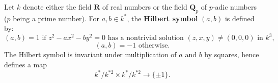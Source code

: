 Let $k$ denote either the field $\mathbf{R}$ of real numbers or the field $\mathbf{Q}_p$ of $p$-adic numbers ($p$ being a prime number). For $a, b \in k^*$, the \textbf{Hilbert symbol} $(a, b)$ is defined by:
$$
(a, b) = 1 \text{ if } z^2 - a x^2 - b y^2 = 0 \text{ has a nontrivial solution } (z, x, y) \neq (0, 0, 0) \text{ in } k^3,
$$
$$
(a, b) = -1 \text{ otherwise.}
$$
The Hilbert symbol is invariant under multiplication of $a$ and $b$ by squares, hence defines a map
$$
k^*/k^{*2} \times k^*/k^{*2} \to \{\pm 1\}.
$$
